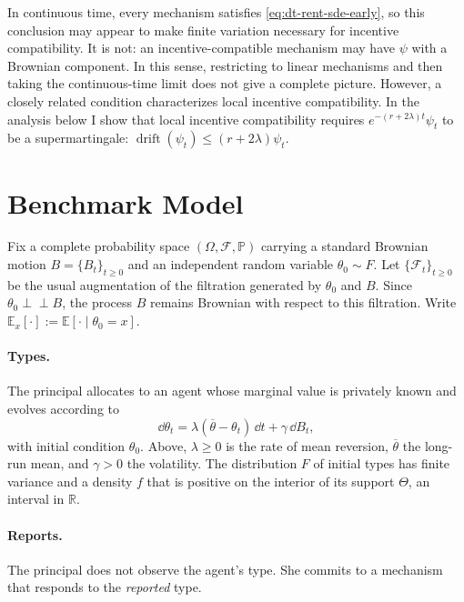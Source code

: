 \documentclass[12pt]{article}
\DeclareMathOperator{\drift}{drift}
\newcommand{\E}{\mathbb{E}}
\begin{document}
In continuous time, every mechanism satisfies
\eqref{eq:dt-rent-sde-early}, so this conclusion may appear to make
finite variation necessary for incentive compatibility. It is not: an 
incentive-compatible mechanism may have \(\psi\) with a Brownian
component. In this sense, restricting to linear mechanisms and then taking the continuous-time limit does not give a complete picture.
However, a closely related condition characterizes local incentive compatibility. In the analysis below I show that local incentive compatibility requires
\(e^{-(r+2\lambda)t}\psi_t\) to be a supermartingale:
\(
\drift(\psi_t)\leq (r+2\lambda)\psi_t.
\)



\section{Benchmark Model}\label{sec:model}

Fix a complete probability space
\((\Omega,\mathcal F,\mathbb P)\) carrying a standard Brownian motion
\(B=\{B_t\}_{t\geq0}\) and an independent random variable
\(\theta_0\sim F\). Let \(\{\mathcal F_t\}_{t\geq0}\) be the usual
augmentation of the filtration generated by \(\theta_0\) and
$B$. Since \(\theta_0\perp\!\!\!\perp B\), the process \(B\) remains Brownian
with respect to this filtration. Write
\(\E_x[\cdot]:=\E[\cdot\mid\theta_0=x]\). 

\paragraph{Types.}
The principal allocates to an agent whose marginal value is privately known and evolves
according to
\begin{equation}\label{eq:OU}
  \dd\theta_t
  =
  \lambda(\overline\theta-\theta_t)\,\dd t
  +\gamma\,\dd B_t,
\end{equation}
with initial condition $\theta_0$. Above, 
\(\lambda\geq0\) is the rate of
mean reversion, \(\overline\theta\) the long-run mean, and
\(\gamma>0\) the volatility. The distribution \(F\) of initial types
has finite variance and a density \(f\) that is positive on the
interior of its support \(\Theta\), an interval in \(\mathbb R\).

\paragraph{Reports.}
The principal does not observe the agent's type. She commits to a mechanism that responds to the \emph{reported} type. 
\end{document}
